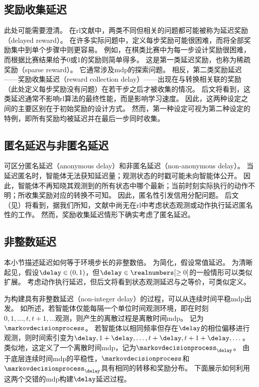 \subsection{奖励收集延迟}
\label{subsec:reward_delay}
此处可能需要澄清。
在\gls{rl}文献中，两类不同但相关的问题都可能被称为延迟奖励（delayed reward）。
在许多实际问题中，定义每步奖励可能很困难，而将全部奖励集中到单个步骤中则更容易\cite{han2022off}。
例如，在棋类比赛中为每一步设计奖励很困难，而根据比赛结果给予0或1的奖励则简单得多。
这是第一类延迟奖励，也称为稀疏奖励（sparse reward）。
它通常涉及\gls{mdp}的探索问题。
相反，第二类奖励延迟——奖励收集延迟（reward collection delay）——出现在与转换相关联的奖励（此处定义每步奖励没有问题）在若干步之后才被收集的情况。
后文将看到，这类延迟通常不影响\gls{rl}算法的最终性能，而是影响学习速度。
因此，这两种设定之间的主要区别在于初始奖励的设计方式。
然而，第一种设定可视为第二种设定的特例，即所有奖励均被延迟并在最后一步同时收集。

\subsection{匿名延迟与非匿名延迟}
\label{subsec:anonymous_delays}
可区分匿名延迟（anonymous delay）和非匿名延迟（non-anonymous delay）。
当延迟匿名时，智能体无法获知延迟量；观测状态的时戳可能未向智能体公开。
因此，智能体不再知晓其观测到的所有状态中哪个最新；当前时刻实际执行的动作不明；所收集奖励对应的转换不可知。
因此，匿名性引发信用分配问题。
后文（见）将看到，据我们所知，文献中尚无在\gls{rl}中考虑状态观测或动作执行延迟匿名性的工作。
然而，奖励收集延迟情形下确实考虑了匿名延迟。

\subsection{非整数延迟}
\label{subsec:non_int_delays}
本小节描述延迟如何等于环境步长的非整数倍。
为简化，假设常值延迟。
为清晰起见，假设$\delay\in(0,1)$，但$\delay\in\realnumbers[\ge0]$的一般情形可以类似扩展。
考虑动作执行延迟，但后文将看到状态观测延迟与之等价，可类似定义。

为构建具有非整数延迟（non-integer delay）的过程，可以从连续时间平稳\gls{mdp}出发。
如\cite{sutton1999between}所述，若智能体仅能每隔一个单位时间观测环境，即在时刻$0,1,\dots,t,t+1,\dots$观测，则产生的离散过程是离散时间\gls{mdp}。
记为$\markovdecisionprocess$。
若智能体以相同频率但存在$\delay$的相位偏移进行观测，则时间索引变为$\delay,1+\delay,\dots,t+\delay,t+1+\delay,\dots$。
类似地，这定义了一个离散时间\gls{mdp}，记为$\markovdecisionprocess_\delay$。
由于底层连续时间\gls{mdp}的平稳性，$\markovdecisionprocess$和$\markovdecisionprocess_\delay$具有相同的转移和奖励分布。
下面展示如何利用这两个交错的\gls{mdp}构建$\delay$延迟过程。


